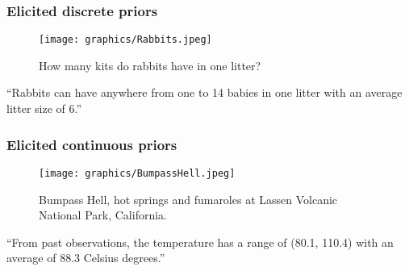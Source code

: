 \documentclass{beamer}
\newcommand{\1}{\ensuremath{\mathbf{1}}}
\begin{document}
%
%
%
\begin{frame}\frametitle{Elicited \textbf{discrete} priors}
	\begin{figure}
	\begin{center}
		\texttt{[image: graphics/Rabbits.jpeg]}
	\end{center}
	\caption{How many kits do rabbits have in one litter?}
	\end{figure}
	\vspace{-3.5ex}\begin{block}{}
	``Rabbits can have anywhere from one to 14 babies in one litter with an average litter size of 6.''
	\end{block}
\end{frame}
%
%
%
\begin{frame}\frametitle{Elicited \textbf{continuous} priors}
	\begin{figure}
	\begin{center}
		\texttt{[image: graphics/BumpassHell.jpeg]}
	\end{center}
	\caption{Bumpass Hell, hot springs and fumaroles at Lassen Volcanic National Park, California.}
	\end{figure}
	\vspace{-2ex}\begin{block}{}
		``From past observations, the temperature has a range of (80.1, 110.4) with an average of 88.3 Celsius degrees.''
	\end{block}
\end{frame}
\end{document}
